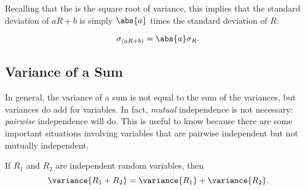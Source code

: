 Recalling that the  is the square root of
variance, this implies that the standard deviation of $a R + b$ is simply
$\abs{a}$ times the standard deviation of $R$:
\begin{corollary}
\[
\sigma_{(aR+b)} = \abs{a}\sigma_{R}.
\]
\end{corollary}


\subsection{Variance of a Sum}

In general, the variance of a sum is not equal to the sum of the
variances, but variances do add for \emph{} variables.
In fact,  \emph{mutual} independence is not
necessary:  \emph{pairwise} independence will
do.  This is useful to know because there are some important situations
involving variables that are pairwise independent but not mutually
independent.

\begin{theorem}\label{indvar}
If $R_1$ and $R_2$ are independent random variables, then
\begin{equation}\label{vR+R}
\variance{R_1 + R_2} = \variance{R_1} + \variance{R_2}.
\end{equation}
\end{theorem}

